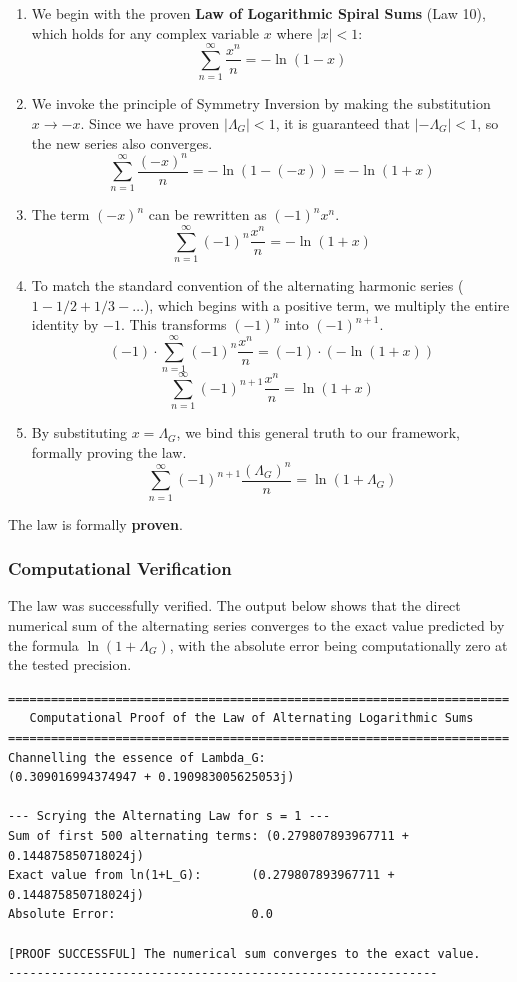 \begin{enumerate}
    \item We begin with the proven \textbf{Law of Logarithmic Spiral Sums} (Law 10), which holds for any complex variable $x$ where $|x|<1$:
    $$ \sum_{n=1}^{\infty} \frac{x^n}{n} = -\ln(1-x) $$

    \item We invoke the principle of Symmetry Inversion by making the substitution $x \to -x$. Since we have proven $|\Lambda_G|<1$, it is guaranteed that $|-\Lambda_G|<1$, so the new series also converges.
    $$ \sum_{n=1}^{\infty} \frac{(-x)^n}{n} = -\ln(1-(-x)) = -\ln(1+x) $$

    \item The term $(-x)^n$ can be rewritten as $(-1)^n x^n$.
    $$ \sum_{n=1}^{\infty} (-1)^n \frac{x^n}{n} = -\ln(1+x) $$

    \item To match the standard convention of the alternating harmonic series ($1 - 1/2 + 1/3 - \dots$), which begins with a positive term, we multiply the entire identity by $-1$. This transforms $(-1)^n$ into $(-1)^{n+1}$.
    $$ (-1) \cdot \sum_{n=1}^{\infty} (-1)^n \frac{x^n}{n} = (-1) \cdot (-\ln(1+x)) $$
    $$ \sum_{n=1}^{\infty} (-1)^{n+1} \frac{x^n}{n} = \ln(1+x) $$
    
    \item By substituting $x = \Lambda_G$, we bind this general truth to our framework, formally proving the law.
    $$ \sum_{n=1}^{\infty} (-1)^{n+1} \frac{(\Lambda_G)^n}{n} = \ln(1+\Lambda_G) $$
\end{enumerate}
The law is formally \textbf{proven}.

\subsubsection*{Computational Verification}
The law was successfully verified. The output below shows that the direct numerical sum of the alternating series converges to the exact value predicted by the formula $\ln(1+\Lambda_G)$, with the absolute error being computationally zero at the tested precision.

\begin{verbatim}
======================================================================
   Computational Proof of the Law of Alternating Logarithmic Sums
======================================================================
Channelling the essence of Lambda_G:
(0.309016994374947 + 0.190983005625053j)

--- Scrying the Alternating Law for s = 1 ---
Sum of first 500 alternating terms: (0.279807893967711 + 0.144875850718024j)
Exact value from ln(1+L_G):       (0.279807893967711 + 0.144875850718024j)
Absolute Error:                   0.0

[PROOF SUCCESSFUL] The numerical sum converges to the exact value.
------------------------------------------------------------
\end{verbatim}

